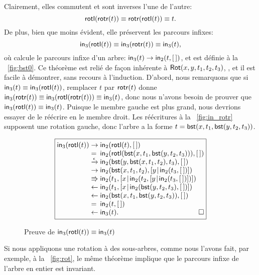 Clairement, elles commutent et sont inverses l'une de l'autre:
\begin{equation*}
\abovedisplayskip=5pt
\belowdisplayskip=5pt
\fun{rotl}(\fun{rotr}(t)) \equiv \fun{rotr}(\fun{rotl}(t)) \equiv t.
\end{equation*}
De plus, bien que moins évident, elle préservent les parcours infixes:
\begin{equation*}
  \abovedisplayskip=5pt
  \belowdisplayskip=5pt
  \fun{in}_3(\fun{rotl}(t)) \equiv \fun{in}_3(\fun{rotr}(t)) \equiv
  \fun{in}_3(t),
\end{equation*}
où  calcule le parcours
infixe d'un arbre: \(\textsf{in}_3(t) \rightarrow \textsf{in}_2(t,[\,])\), et
 est définie à la
\fig~\vref{fig:bst0}. Ce théorème est relié de façon inhérente à
\(\textsf{Rot}({x,y,t_1,t_2,t_3})\),
, et il est facile à démontrer, sans recours à
l'induction. D'abord, nous remarquons que si \(\textsf{in}_3(t) \equiv
\textsf{in}_3(\textsf{rotl}(t))\), remplacer \(t\) par \(\textsf{rotr}(t)\)
donne \(\textsf{in}_3(\textsf{rotr}(t)) \equiv
\textsf{in}_3(\textsf{rotl}(\textsf{rotr}(t))) \equiv \textsf{in}_3(t)\), donc
nous n'avons besoin de prouver que \(\textsf{in}_3(\textsf{rotl}(t)) \equiv
\textsf{in}_3(t)\). Puisque le membre gauche est plus grand, nous
devrions essayer de le réécrire en le membre droit. Les réécritures à
la \fig~\vref{fig:in_rotr} supposent une rotation gauche, donc l'arbre
a la forme \(t=\textsf{bst}(x,t_1,\textsf{bst}(y,t_2,t_3))\).
\begin{figure}
  \begin{equation*}
    \boxed{
      \begin{array}{@{}r@{\;}l@{\;}l@{}}
  \fun{in}_3(\fun{rotl}(t))
  & \rightarrow & \fun{in}_2(\fun{rotl}(t),\el)\\
  & = & \fun{in}_2(\fun{rotl}(\fun{bst}(x,t_1,\fun{bst}(y,t_2,t_3))),\el)\\
  & \xrightarrow{\smash{\epsilon}} &
  \fun{in}_2(\fun{bst}(y,\fun{bst}(x,t_1,t_2),t_3),\el)\\
  & \rightarrow &
  \fun{in}_2(\fun{bst}(x,t_1,t_2),\cons{y}{\fun{in}_2(t_3,\el)})\\
  & \Rrightarrow &
 \fun{in}_2(t_1,\cons{x}{\fun{in}_2(t_2,\cons{y}{\fun{in}_2(t_3,\el)})})\\
  & \leftarrow &
  \fun{in}_2(t_1,\cons{x}{\fun{in}_2(\fun{bst}(y,t_2,t_3),\el)})\\
  & \leftarrow &
  \fun{in}_2(\fun{bst}(x,t_1,\fun{bst}(y,t_2,t_3)),\el)\\
  & = &
  \fun{in}_2(t,\el)\\
  & \leftarrow &
  \fun{in}_3(t).\hfill\Box
\end{array}
}
\end{equation*}
\caption{Preuve de \(\textsf{in}_3(\textsf{rotl}(t)) \equiv
  \textsf{in}_3(t)\)\label{fig:in_rotr}}
\end{figure}
Si nous appliquons une rotation à des sous-arbres, comme nous l'avons
fait, par exemple, à la \fig~\vref{fig:rot}, le même théorème implique
que le parcours infixe de l'arbre en entier est invariant.

